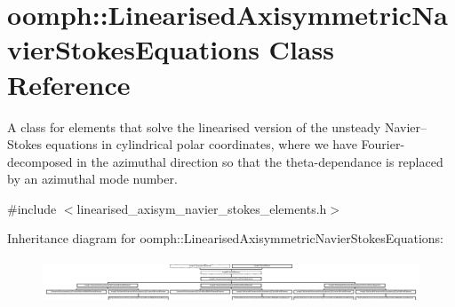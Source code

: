 \hypertarget{classoomph_1_1LinearisedAxisymmetricNavierStokesEquations}{}\section{oomph\+:\+:Linearised\+Axisymmetric\+Navier\+Stokes\+Equations Class Reference}
\label{classoomph_1_1LinearisedAxisymmetricNavierStokesEquations}


A class for elements that solve the linearised version of the unsteady Navier--Stokes equations in cylindrical polar coordinates, where we have Fourier-\/decomposed in the azimuthal direction so that the theta-\/dependance is replaced by an azimuthal mode number.  




{\ttfamily \#include $<$linearised\+\_\+axisym\+\_\+navier\+\_\+stokes\+\_\+elements.\+h$>$}

Inheritance diagram for oomph\+:\+:Linearised\+Axisymmetric\+Navier\+Stokes\+Equations\+:\begin{figure}[H]
\begin{center}
\leavevmode
\includegraphics[height=1.314554cm]{classoomph_1_1LinearisedAxisymmetricNavierStokesEquations}
\end{center}
\end{figure}
